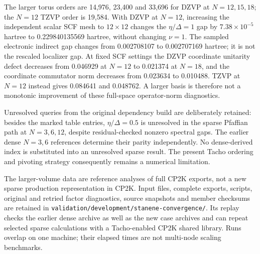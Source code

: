 \documentclass[11pt]{article}
\begin{document}
The larger torus orders are 14,976, 23,400 and 33,696 for
DZVP at $N=12,15,18$; the $N=12$ TZVP order is 19,584.
With DZVP at $N=12$, increasing the independent scalar SCF
mesh to $12\times12$ changes the $\eta/\Delta=1$ gap by
$7.38\times10^{-5}$ hartree to 0.229840135569 hartree,
without changing $\nu=1$. The sampled electronic indirect gap
changes from 0.002708107 to 0.002707169 hartree; it is not the
rescaled localizer gap. At fixed SCF settings the DZVP coordinate
unitarity defect decreases from 0.046929 at $N=12$ to 0.021374
at $N=18$, and the coordinate commutator norm decreases from
0.023634 to 0.010488. TZVP at $N=12$ instead gives 0.084641
and 0.048762. A larger basis is therefore not a monotonic
improvement of these full-space operator-norm diagnostics.

Unresolved queries from the original dependency build are deliberately
retained: besides the marked table entries, $\eta/\Delta=0.5$ is unresolved in the sparse
Pfaffian path at $N=3,6,12$, despite residual-checked nonzero
spectral gaps. The earlier dense $N=3,6$ references determine
their parity independently. No dense-derived index is substituted
into an unresolved sparse result. The present Tacho ordering and
pivoting strategy consequently remains a numerical limitation.

The larger-volume data are reference analyses of full CP2K
exports, not a new sparse production representation in CP2K.
Input files, complete exports, scripts, original and retried
factor diagnostics, source snapshots and member checksums are
retained in \nolinkurl{validation/development/stanene-convergence/}.
Its replay checks the earlier dense archive as well as the new
case archives and can repeat selected sparse calculations with
a Tacho-enabled CP2K shared library. Runs overlap on one machine;
their elapsed times are not multi-node scaling benchmarks.
\end{document}
